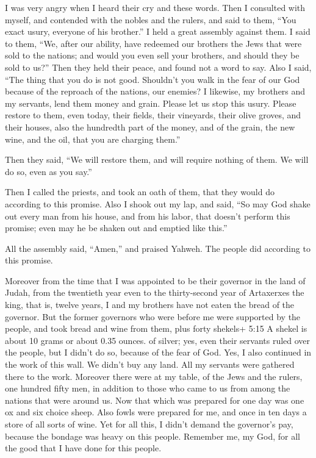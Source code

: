  I was very angry when I heard their cry and these words.
 Then I consulted with myself, and contended with the nobles
and the rulers, and said to them, ``You exact usury, everyone of his
brother.'' I held a great assembly against them.  I said to
them, ``We, after our ability, have redeemed our brothers the Jews that
were sold to the nations; and would you even sell your brothers, and
should they be sold to us?'' Then they held their peace, and found not a
word to say.  Also I said, ``The thing that you do is not
good. Shouldn't you walk in the fear of our God because of the reproach
of the nations, our enemies?  I likewise, my brothers and
my servants, lend them money and grain. Please let us stop this usury.
 Please restore to them, even today, their fields, their
vineyards, their olive groves, and their houses, also the hundredth part
of the money, and of the grain, the new wine, and the oil, that you are
charging them.''

 Then they said, ``We will restore them, and will require
nothing of them. We will do so, even as you say.''

Then I called the priests, and took an oath of them, that they would do
according to this promise.  Also I shook out my lap, and
said, ``So may God shake out every man from his house, and from his
labor, that doesn't perform this promise; even may he be shaken out and
emptied like this.''

All the assembly said, ``Amen,'' and praised Yahweh. The people did
according to this promise.

 Moreover from the time that I was appointed to be their
governor in the land of Judah, from the twentieth year even to the
thirty-second year of Artaxerxes the king, that is, twelve years, I and
my brothers have not eaten the bread of the governor.  But
the former governors who were before me were supported by the people,
and took bread and wine from them, plus forty shekels+ 5:15 A shekel is
about 10 grams or about 0.35 ounces. of silver; yes, even their servants
ruled over the people, but I didn't do so, because of the fear of God.
 Yes, I also continued in the work of this wall. We didn't
buy any land. All my servants were gathered there to the work.
 Moreover there were at my table, of the Jews and the
rulers, one hundred fifty men, in addition to those who came to us from
among the nations that were around us.  Now that which was
prepared for one day was one ox and six choice sheep. Also fowls were
prepared for me, and once in ten days a store of all sorts of wine. Yet
for all this, I didn't demand the governor's pay, because the bondage
was heavy on this people.  Remember me, my God, for all the
good that I have done for this people.

